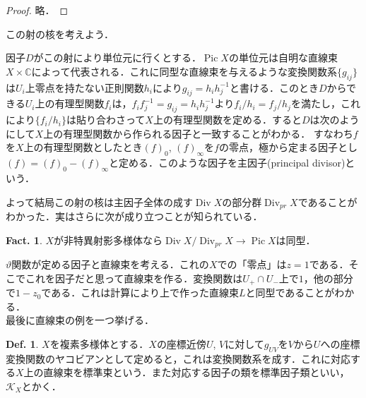 \documentclass[dvipdfmx,b5paper,papersize]{jsarticle}
\theoremstyle{definition}
\newtheorem{defi}[thm]{Def.}
\newtheorem{fact}[thm]{Fact.}
\begin{document}
\begin{proof}
  略．
\end{proof}

この射の核を考えよう．

因子$D$がこの射により単位元に行くとする．$\operatorname{Pic}X$の単位元は自明な直線束$X \times \mathbb{C}$によって代表される．これに同型な直線束を与えるような変換関数系$\{g_{ij}\}$は$U_i$上零点を持たない正則関数$h_i$により$g_{ij}=h_i h_j^{-1}$と書ける．このとき$D$からできる$U_i$上の有理型関数$f_i$は，$f_i f_j^{-1}=g_{ij}=h_i h_j^{-1}$より$f_i/h_i=f_j/h_j$を満たし，これにより$\{f_i/h_i\}$は貼り合わさって$X$上の有理型関数を定める．すると$D$は次のようにして$X$上の有理型関数から作られる因子と一致することがわかる．
すなわち$f$を$X$上の有理型関数としたとき$(f)_0$, $(f)_{\infty}$を$f$の零点，極から定まる因子とし$(f)=(f)_0 -(f)_{\infty}$と定める．このような因子を主因子(principal divisor)という．

よって結局この射の核は主因子全体の成す$\operatorname{Div}X$の部分群$\operatorname{Div}_{pr}X$であることがわかった．実はさらに次が成り立つことが知られている．

\begin{fact}
  $X$が非特異射影多様体なら$\operatorname{Div}X/\operatorname{Div}_{pr}X \to \operatorname{Pic}X$は同型．
\end{fact}

$\vartheta$関数が定める因子と直線束を考える．これの$X$での「零点」は$z=1$である．そこでこれを因子だと思って直線束を作る．変換関数は$U_{+} \cap U_{-}$上で$1$，他の部分で$1-z_0$である．これは計算により上で作った直線束$L$と同型であることがわかる．\\

最後に直線束の例を一つ挙げる．

\begin{defi}
  $X$を複素多様体とする．$X$の座標近傍$U$, $V$に対して$g_{UV}$を$V$から$U$への座標変換関数のヤコビアンとして定めると，これは変換関数系を成す．これに対応する$X$上の直線束を標準束という．また対応する因子の類を標準因子類といい，${\mathcal{K}}_X$とかく．
\end{defi}
\end{document}

